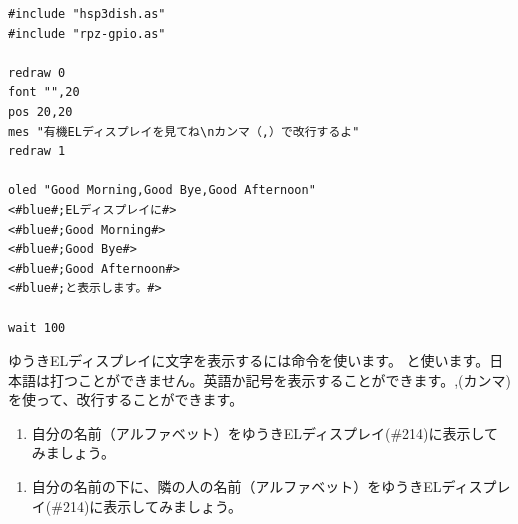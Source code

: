 \begin{lstlisting}[caption=oled.hsp,label=oled.hsp]
#include "hsp3dish.as"
#include "rpz-gpio.as"

redraw 0
font "",20
pos 20,20
mes "有機ELディスプレイを見てね\nカンマ（,）で改行するよ"
redraw 1

oled "Good Morning,Good Bye,Good Afternoon"
<#blue#;ELディスプレイに#>
<#blue#;Good Morning#>
<#blue#;Good Bye#>
<#blue#;Good Afternoon#>
<#blue#;と表示します。#>

wait 100
\end{lstlisting}

ゆうきELディスプレイに文字を表示するには命令を使います。
と使います。日本語は打つことができません。英語か記号を表示することができます。,(カンマ)を使って、改行することができます。\\

\begin{tcolorbox}[title=\useOmetoi]
\begin{enumerate}
\item 自分の名前（アルファベット）をゆうきELディスプレイ(\#214)に表示してみましょう。
\end{enumerate}
\end{tcolorbox}
\begin{tcolorbox}[title=\useOmetoi]
\begin{enumerate}
\item 自分の名前の下に、隣の人の名前（アルファベット）をゆうきELディスプレイ(\#214)に表示してみましょう。
\end{enumerate}
\end{tcolorbox}